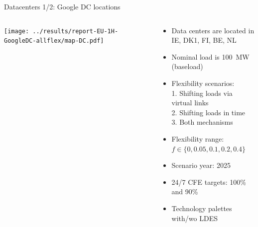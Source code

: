 \begin{frame}{Datacenters 1/2: Google DC locations}

  \begin{columns}[T]
  \begin{column}{10cm}

  \centering
  \texttt{[image: ../results/report-EU-1H-GoogleDC-allflex/map-DC.pdf]}


  \end{column}

  \begin{column}{6cm}
  {\small
  \begin{itemize}

  \item Data centers are located in \\ \alert{IE, DK1, FI, BE, NL}
  \item Nominal load is 100~MW (baseload)
  \item Flexibility scenarios: \\
        1. Shifting loads via virtual links \\ 
        2. Shifting loads in time \\ 
        3. Both mechanisms
  \item Flexibility range: $f \in \{0,0.05,0.1,0.2,0.4\}$ 
  \item Scenario year: 2025
  \item 24/7 CFE targets: 100\% and 90\%
  \item Technology palettes with/wo LDES
  
\end{itemize}
  }

  \end{column}
  \end{columns}

\end{frame}


